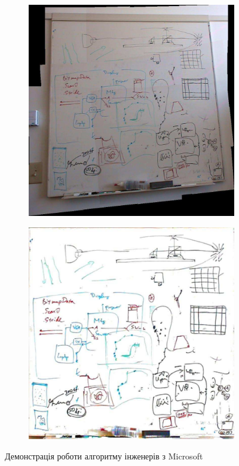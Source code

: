\begin{figure}[h]
  \centering
  \begin{subfigure}[b]{0.35\textwidth}
    \centering
    \includegraphics[width=\textwidth]{images/zhang_2004_1}
  \end{subfigure}
  \begin{subfigure}[b]{0.35\textwidth}
    \centering
    \includegraphics[width=\textwidth]{images/zhang_2004_2}
  \end{subfigure}
  \caption{Демонстрація роботи алгоритму інженерів з Microsoft \cite{zhang:2004}
    \label{fig:zhang:2004}
  }
\end{figure}

